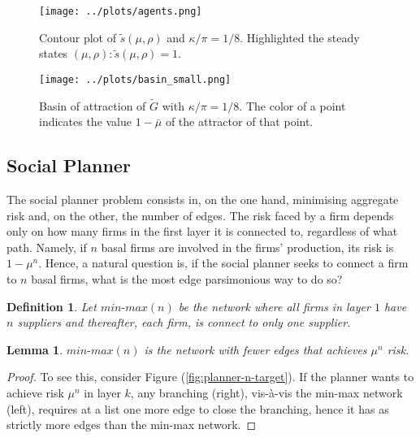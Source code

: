 \documentclass[american, abstract=on]{scrartcl}
\theoremstyle{plain}
\newtheorem{lemma}{Lemma}
\newtheorem{definition}{Definition}
\begin{document}
\begin{figure}[H]
  \centering
  \texttt{[image: ../plots/agents.png]}
  \caption{Contour plot of $\tilde{s}(\mu, \rho)$ and $\kappa / \pi = 1 / 8$. Highlighted the steady states $(\mu, \rho): \tilde{s}(\mu, \rho) = 1$.}
  \label{fig:agents-optimum}
\end{figure}

\begin{figure}[H]
  \centering
  \texttt{[image: ../plots/basin\_small.png]}
  \caption{Basin of attraction of $\tilde{G}$ with $\kappa / \pi = 1 / 8$. The color of a point indicates the value $1 - \bar{\mu}$ of the attractor of that point.}
  \label{fig:basin-plot}
\end{figure}


\subsection{Social Planner}

The social planner problem consists in, on the one hand, minimising aggregate risk and, on the other, the number of edges. The risk faced by a firm depends only on how many firms in the first layer it is connected to, regardless of what path. Namely, if $n$ basal firms are involved in the firms' production, its risk is $1 - \mu^n$. Hence, a natural question is, if the social planner seeks to connect a firm to $n$ basal firms, what is the most edge parsimonious way to do so? 

\begin{definition}
  Let $\textit{min-max}(n)$ be the network where all firms in layer $1$ have $n$ suppliers and thereafter, each firm, is connect to only one supplier. 
\end{definition}

\begin{lemma}
  $\textit{min-max}(n)$ is the network with fewer edges that achieves $\mu^n$ risk.
\end{lemma}

\begin{proof}

To see this, consider Figure (\ref{fig:planner-n-target}). If the planner wants to achieve risk $\mu^n$ in layer $k$, any branching (right), vis-à-vis the min-max network (left), requires at a list one more edge to close the branching, hence it has as strictly more edges than the min-max network.

\end{proof}
\end{document}
